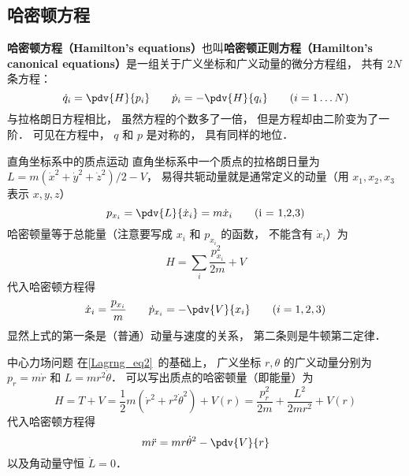\subsection{哈密顿方程}
\textbf{哈密顿方程（Hamilton's equations）}也叫\textbf{哈密顿正则方程（Hamilton's canonical equations）}是一组关于广义坐标和广义动量的微分方程组， 共有 $2N$ 条方程：
\begin{equation}\label{HamCan_eq2}
\dot q_i = \pdv{H}{p_i}
\qquad
\dot p_i = -\pdv{H}{q_i}
\qquad
(i = 1\dots N)
\end{equation}
与拉格朗日方程相比， 虽然方程的个数多了一倍， 但是方程却由二阶变为了一阶． 可见在方程中， $q$ 和 $p$ 是对称的， 具有同样的地位．

\begin{example}{直角坐标系中的质点运动}
直角坐标系中一个质点的拉格朗日量为 $L = m(\dot x^2 + \dot y^2 + \dot z^2)/2 - V$， 易得共轭动量就是通常定义的动量（用 $x_1,x_2,x_3$ 表示 $x, y, z$）
\begin{equation}
p_{x_i} = \pdv{L}{\dot x_i} = m\dot x_i \qquad \text{(i = 1,2,3)}
\end{equation}
哈密顿量等于总能量（注意要写成 $x_i$ 和 $p_{x_i}$ 的函数， 不能含有 $\dot x_i$）为
\begin{equation}
H = \sum_i \frac{p_{x_i}^2}{2m} + V
\end{equation}
代入哈密顿方程得
\begin{equation}
\dot x_i = \frac{p_{x_i}}{m}
\qquad
\dot p_{x_i} = -\pdv{V}{x_i}
\qquad (i = 1,2,3)
\end{equation}
显然上式的第一条是（普通）动量与速度的关系， 第二条则是牛顿第二定律．
\end{example}

\begin{example}{中心力场问题}\label{HamCan_ex1}
在\autoref{Lagrng_eq2}~的基础上， 广义坐标 $r, \theta$ 的广义动量分别为 $p_r = m\dot r$ 和 $L = mr^2\dot \theta$． 可以写出质点的哈密顿量（即能量）为
\begin{equation}\label{HamCan_eq3}
H = T + V = \frac12 m(\dot r^2 + r^2 \dot \theta^2) + V(r) = \frac{p_r^2}{2m} + \frac{L^2}{2mr^2} + V(r)
\end{equation}
代入哈密顿方程得
\begin{equation}
m\ddot r = mr \dot \theta^2 - \pdv{V}{r}
\end{equation}
以及角动量守恒 $\dot L = 0$．
\end{example}

